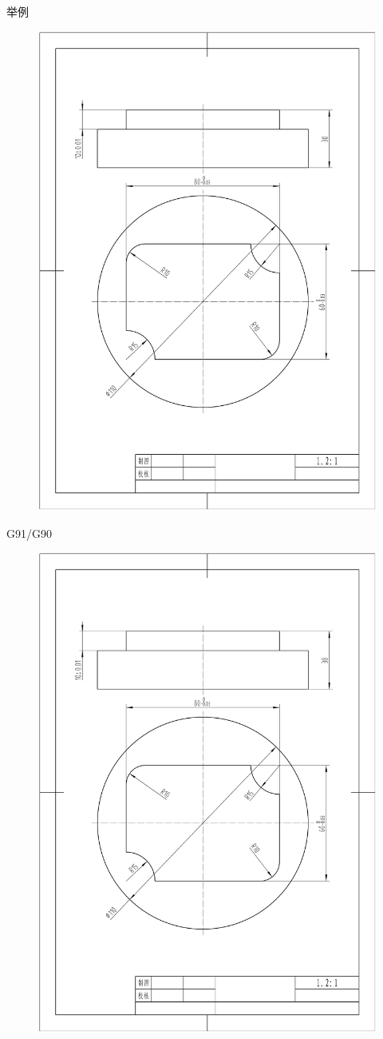 \documentclass[UTF8,zihao=-4]{ctexbeamer}
\begin{document}
\begin{frame}{举例}
\begin{figure}
    \centering
    \includegraphics[width=0.5\linewidth,trim=50 150 50 100,clip]{image/4-1.jpg}
    \label{fig:4-7}
\end{figure}        
\end{frame}

\begin{frame}{G91/G90}
 \begin{figure}
     \centering
     \includegraphics[width=0.5\linewidth,trim=50 150 50 100,clip]{image/4-1.jpg}
     \label{fig:4-8}
 \end{figure}       
\end{frame}
\end{document}
